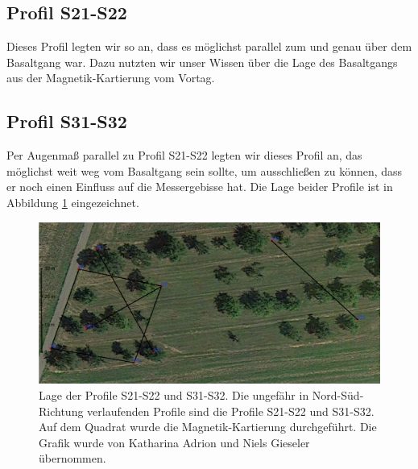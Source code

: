 \subsection{Profil S21-S22}

Dieses Profil legten wir so an, dass es möglichst parallel zum und genau über dem Basaltgang war. Dazu nutzten wir unser Wissen über die Lage des Basaltgangs aus der Magnetik-Kartierung vom Vortag.

\subsection{Profil S31-S32}

Per Augenmaß parallel zu Profil S21-S22 legten wir dieses Profil an, das möglichst weit weg vom Basaltgang sein sollte, um ausschließen zu können, dass er noch einen Einfluss auf die Messergebisse hat. Die Lage beider Profile ist in Abbildung \ref{fig:kleineProfile} eingezeichnet.

\begin{figure}[!ht]
 \centering
 \includegraphics[width=\textwidth]{fig/Seismik_klein_verbund}
 \caption[Lage der Profile S21-S22 und S31-S32]{Lage der Profile S21-S22 und S31-S32. Die ungefähr in Nord-Süd-Richtung verlaufenden Profile sind die Profile S21-S22 und S31-S32. Auf dem Quadrat wurde die Magnetik-Kartierung durchgeführt. Die Grafik wurde von Katharina Adrion und Niels Gieseler übernommen.}
 \label{fig:kleineProfile}
\end{figure}

